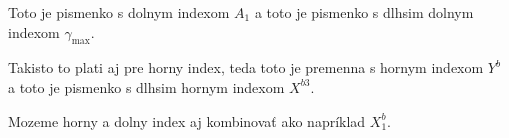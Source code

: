 \documentclass{book}
\begin{document}
Toto je pismenko s dolnym indexom $A_1$ a toto je pismenko s dlhsim dolnym indexom $\gamma_{\max}$.

Takisto to plati aj pre horny index, teda toto je premenna s hornym indexom $Y^b$ a toto je pismenko s dlhsim hornym indexom $X^{b3}$.

Mozeme horny a dolny index aj kombinovať ako napríklad $X^b_1$.
\end{document}
